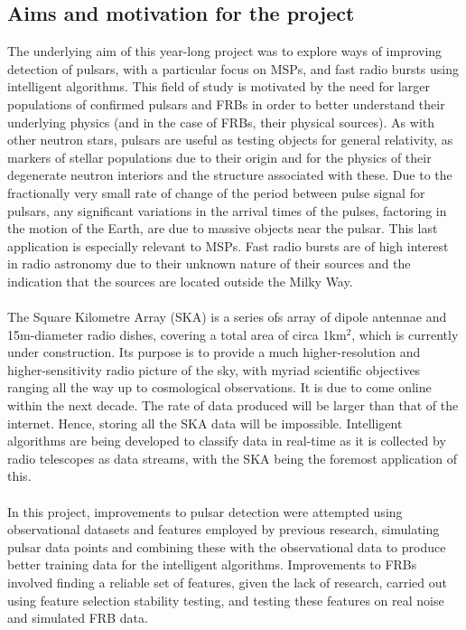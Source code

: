 \documentclass[12pt]{article}
\begin{document}
\subsection{Aims and motivation for the project}
The underlying aim of this year-long project was to explore ways of improving detection of pulsars, with a particular focus on MSPs, and fast radio bursts using intelligent algorithms. This field of study is motivated by the need for larger populations of confirmed pulsars and FRBs in order to better understand their underlying physics (and in the case of FRBs, their physical sources). As with other neutron stars, pulsars are useful as testing objects for general relativity, as markers of stellar populations due to their origin and for the physics of their degenerate neutron interiors and the structure associated with these. Due to the fractionally very small rate of change of the period between pulse signal for pulsars, any significant variations in the arrival times of the pulses, factoring in the motion of the Earth, are due to massive objects near the pulsar. This last application is especially relevant to MSPs. Fast radio bursts are of high interest in radio astronomy due to their unknown nature of their sources and the indication that the sources are located outside the Milky Way.
\paragraph{}
The Square Kilometre Array (SKA) is a series ofs array of dipole antennae and 15m-diameter radio dishes, covering a total area of circa 1km$^{2}$, which is currently under construction. Its purpose is to provide a much higher-resolution and higher-sensitivity radio picture of the sky, with myriad scientific objectives ranging all the way up to cosmological observations. It is due to come online within the next decade. The rate of data produced will be larger than that of the internet. Hence, storing all the SKA data will be impossible. Intelligent algorithms are being developed to classify data in real-time as it is collected by radio telescopes as data streams, with the SKA being the foremost application of this.
\paragraph{}
In this project, improvements to pulsar detection were attempted using observational datasets and features employed by previous research, simulating pulsar data points and combining these with the observational data to produce better training data for the intelligent algorithms. Improvements to FRBs involved finding a reliable set of features, given the lack of research, carried out using feature selection stability testing, and testing these features on real noise and simulated FRB data.
\end{document}
